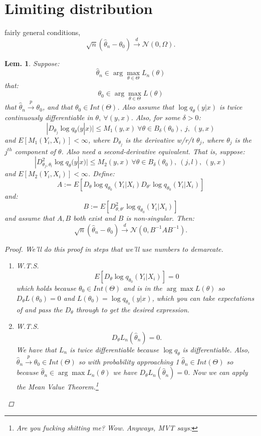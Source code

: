 \documentclass{tufte-book}
\theoremstyle{mytheoremstyle}
\theoremstyle{mylemstyle}
\newtheorem*{lem}{Lem.}
\theoremstyle{mydefstyle}
\begin{document}
\section{Limiting distribution}
 fairly general conditions,
	\[\sqrt{n}(\hat{\theta}_n - \theta_0) \overset{d}{\rightarrow} \mathcal{N}(0, \Omega) \text{.}\]
\begin{lem} Suppose:
	\[\hat{\theta}_n \in \arg \max_{\theta \in \Theta} L_n(\theta)\]
that:
	\[\theta_0 \in \arg \max_{\theta \in \Theta} L(\theta)\]
that \(\hat{\theta}_n \overset{p}{\rightarrow} \theta_0\), and that \(\theta_0 \in Int(\Theta)\). Also assume that \(\log q_\theta(y|x)\) is twice continuously differentiable in \(\theta,\ \forall (y,x)\). Also, for some \(\delta > 0\):
	\[|D_{\theta_j} \log q_\theta (y|x) | \le M_1 (y, x)\ \forall \theta \in B_\delta(\theta_0),\ j,\ (y,x)\]
and \(E[M_1(Y_i, X_i)] < \infty\), where \(D_{\theta_j}\) is the derivative w/r/t \(\theta_j\), where \(\theta_j\) is the \(j^{th}\) component of \(\theta\). Also need a second-derivative equivalent. That is, suppose:
	\[|D^2_{\theta_j,\theta_l} \log q_\theta(y|x)| \le M_2 (y,x)\ \forall \theta \in B_\delta (\theta_0),\ (j,l),\ (y,x)\]
and \(E[M_2(Y_i, X_i)] < \infty\). Define:
	\[A := E[D_\theta \log q_{\theta_0} (Y_i| X_i) D_{\theta'} \log q_{\theta_0}(Y_i|X_i)]\]
and:
	\[B:= E[D^2_{\theta,\theta'} \log q_{\theta_0} (Y_i|X_i)]\]
and assume that \(A,B\) both exist and \(B\) is non-singular. Then:
	\[\sqrt{n}(\hat{\theta}_n - \theta_0) \overset{d}{\rightarrow} \mathcal{N}(0, B^{-1}AB^{-1}) \text{.}\]
\begin{proof} We'll do this proof in steps that we'll use numbers to demarcate. \begin{enumerate}
	\item W.T.S. 
		\[E[D_\theta \log q_{\theta_0} (Y_i | X_i)] = 0\]
	which holds because \(\theta_0 \in Int(\Theta)\) and is in the \(\arg \max L(\theta)\) so \(D_\theta L(\theta_0) = 0\) and \(L(\theta_0) = \log q_{\theta_0} (y|x)\), which you can take expectations of and pass the \(D_\theta\) through to get the desired expression.
	\item W.T.S.
		\[D_\theta L_n(\hat{\theta}_n) = 0 \text{.}\]
	We have that \(L_n\) is twice differentiable because \(\log q_\theta\) is differentiable. Also, \(\hat{\theta}_n \overset{p}{\rightarrow} \theta_0 \in Int(\Theta)\) so with probability approaching 1 \(\hat{\theta}_n \in Int(\Theta)\) so because \(\hat{\theta}_n \in \arg \max L_n(\theta)\) we have \(D_\theta L_n(\hat{\theta}_n) = 0\). Now we can apply the Mean Value Theorem.\footnote{Are you fucking shitting me? Wow. Anyways, MVT says:
}
\end{enumerate}
\end{proof}
\end{lem}
\end{document}
